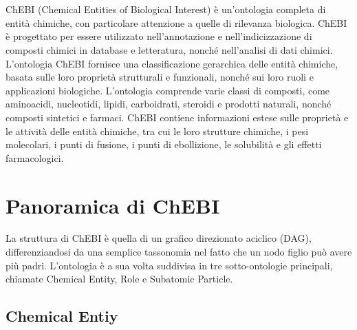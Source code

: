 \documentclass[12pt,a4paper,openright,twoside]{book}
\begin{document}
\frontmatter



\tableofcontents

\mainmatter

\chapter{\introductionname}
\label{chap:introduction}

ChEBI (Chemical Entities of Biological Interest) è un'ontologia completa di entità chimiche, con particolare attenzione a quelle di rilevanza biologica. ChEBI è progettato per essere utilizzato nell'annotazione e nell'indicizzazione di composti chimici in database e letteratura, nonché nell'analisi di dati chimici.
L'ontologia ChEBI fornisce una classificazione gerarchica delle entità chimiche, basata sulle loro proprietà strutturali e funzionali, nonché sui loro ruoli e applicazioni biologiche. L'ontologia comprende varie classi di composti, come aminoacidi, nucleotidi, lipidi, carboidrati, steroidi e prodotti naturali, nonché composti sintetici e farmaci.
ChEBI contiene informazioni estese sulle proprietà e le attività delle entità chimiche, tra cui le loro strutture chimiche, i pesi molecolari, i punti di fusione, i punti di ebollizione, le solubilità e gli effetti farmacologici.

\chapter{Panoramica di ChEBI} %
\label{chap:panoramica}
La struttura di ChEBI è quella di un grafico direzionato aciclico (DAG),
differenziandosi da una semplice tassonomia nel fatto che un nodo figlio può avere più padri.
L'ontologia è a sua volta suddivisa in tre sotto-ontologie principali, chiamate Chemical Entity, Role e Subatomic Particle.

\section{Chemical Entiy}
\end{document}
